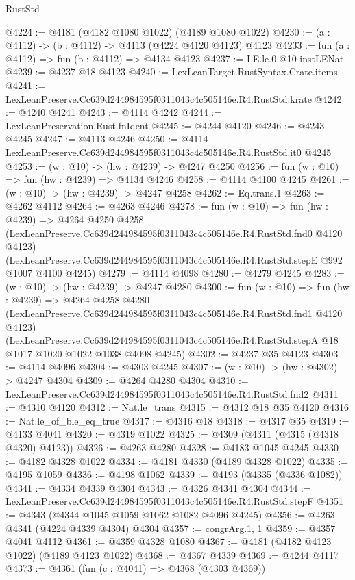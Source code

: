 \begin{lexlean}{RustStd}
\begin{coremodule}
@4224 := @4181 (@4182 @1080 @1022) (@4189 @1080 @1022)
@4230 := (a : @4112) -> (b : @4112) -> @4113 (@4224 @4120 @4123) @4123
@4233 := fun (a : @4112) => fun (b : @4112) => @4134 @4123
@4237 := LE.le.{0} @10 instLENat
@4239 := @4237 @18 @4123
@4240 := LexLeanTarget.RustSyntax.Crate.items
@4241 := LexLeanPreserve.Cc639d244984595f0311043c4c505146e.R4.RustStd.krate
@4242 := @4240 @4241
@4243 := @4114 @4242
@4244 := LexLeanPreservation.Rust.fnIdent
@4245 := @4244 @4120
@4246 := @4243 @4245
@4247 := @4113 @4246
@4250 := @4114 LexLeanPreserve.Cc639d244984595f0311043c4c505146e.R4.RustStd.it0 @4245
@4253 := (w : @10) -> (hw : @4239) -> @4247 @4250
@4256 := fun (w : @10) => fun (hw : @4239) => @4134 @4246
@4258 := @4114 @4100 @4245
@4261 := (w : @10) -> (hw : @4239) -> @4247 @4258
@4262 := Eq.trans.{1}
@4263 := @4262 @4112
@4264 := @4263 @4246
@4278 := fun (w : @10) =>
  fun (hw : @4239) =>
  @4264
    @4250
    @4258
    (LexLeanPreserve.Cc639d244984595f0311043c4c505146e.R4.RustStd.fnd0 @4120 @4123)
    (LexLeanPreserve.Cc639d244984595f0311043c4c505146e.R4.RustStd.stepE @992 @1007 @4100 @4245)
@4279 := @4114 @4098
@4280 := @4279 @4245
@4283 := (w : @10) -> (hw : @4239) -> @4247 @4280
@4300 := fun (w : @10) =>
  fun (hw : @4239) =>
  @4264
    @4258
    @4280
    (LexLeanPreserve.Cc639d244984595f0311043c4c505146e.R4.RustStd.fnd1 @4120 @4123)
    (LexLeanPreserve.Cc639d244984595f0311043c4c505146e.R4.RustStd.stepA
      @18
      @1017
      @1020
      @1022
      @1038
      @4098
      @4245)
@4302 := @4237 @35 @4123
@4303 := @4114 @4096
@4304 := @4303 @4245
@4307 := (w : @10) -> (hw : @4302) -> @4247 @4304
@4309 := @4264 @4280 @4304
@4310 := LexLeanPreserve.Cc639d244984595f0311043c4c505146e.R4.RustStd.fnd2
@4311 := @4310 @4120
@4312 := Nat.le_trans
@4315 := @4312 @18 @35 @4120
@4316 := Nat.le_of_ble_eq_true
@4317 := @4316 @18
@4318 := @4317 @35
@4319 := @4133 @4041
@4320 := @4319 @1022
@4325 := @4309 (@4311 (@4315 (@4318 @4320) @4123))
@4326 := @4263 @4280
@4328 := @4183 @1045 @4245
@4330 := @4182 @4328 @1022
@4334 := @4181 @4330 (@4189 @4328 @1022)
@4335 := @4195 @1059
@4336 := @4198 @1062
@4339 := @4193 (@4335 (@4336 @1082))
@4341 := @4334 @4339 @4304
@4343 := @4326 @4341 @4304
@4344 := LexLeanPreserve.Cc639d244984595f0311043c4c505146e.R4.RustStd.stepF
@4351 := @4343 (@4344 @1045 @1059 @1062 @1082 @4096 @4245)
@4356 := @4263 @4341 (@4224 @4339 @4304) @4304
@4357 := congrArg.{1, 1}
@4359 := @4357 @4041 @4112
@4361 := @4359 @4328 @1080
@4367 := @4181 (@4182 @4123 @1022) (@4189 @4123 @1022)
@4368 := @4367 @4339
@4369 := @4244 @4117
@4373 := @4361 (fun (c : @4041) => @4368 (@4303 @4369))

\end{coremodule}
\end{lexlean}
